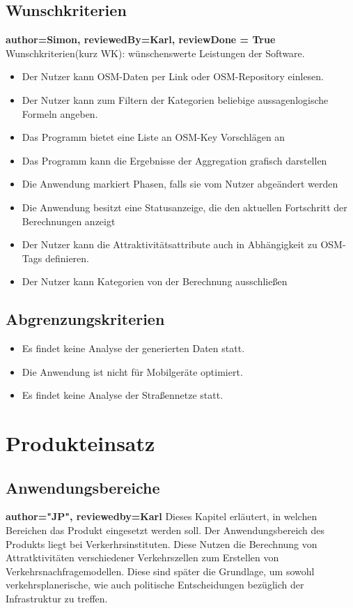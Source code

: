 \documentclass[parskip=full]{scrartcl} %
\begin{document}
\subsection{Wunschkriterien}
\textbf{author=Simon, reviewedBy=Karl, reviewDone = True\\}
Wunschkriterien(kurz WK): wünschenswerte Leistungen der Software.
\begin{itemize}
    \item <WK1> Der Nutzer kann OSM-Daten per Link oder OSM-Repository einlesen.
    \item <WK2> Der Nutzer kann zum Filtern der Kategorien beliebige aussagenlogische Formeln angeben.
    \item <WK3> Das Programm bietet eine Liste an OSM-Key Vorschlägen an
    \item <WK4> Das Programm kann die Ergebnisse der Aggregation grafisch darstellen
    \item <WK5> Die Anwendung markiert Phasen, falls sie vom Nutzer abgeändert werden
    \item <WK6> Die Anwendung besitzt eine Statusanzeige, die den aktuellen Fortschritt der Berechnungen anzeigt
    \item <WK7> Der Nutzer kann die Attraktivitätsattribute auch in Abhängigkeit zu OSM-Tags definieren.
    \item <WK8> Der Nutzer kann Kategorien von der Berechnung ausschließen
    
\end{itemize}

\subsection{Abgrenzungskriterien}
\begin{itemize}
    \item Es findet keine Analyse der generierten Daten statt.
    \item Die Anwendung ist nicht für Mobilgeräte optimiert.
    \item Es findet keine Analyse der Straßennetze statt.
\end{itemize}
\newpage

\section{Produkteinsatz}

\subsection{Anwendungsbereiche}
\textbf{author="JP", reviewedby=Karl} 
Dieses Kapitel erläutert, in welchen Bereichen das Produkt eingesetzt werden soll. Der Anwendungsbereich des Produkts liegt bei Verkerhrsinstituten. Diese Nutzen die Berechnung von Attratktivitäten verschiedener Verkehrszellen zum Erstellen von Verkehrsnachfragemodellen. Diese sind später die Grundlage, um sowohl verkehrsplanerische, wie auch politische Entscheidungen bezüglich der Infrastruktur zu treffen.
\end{document}
